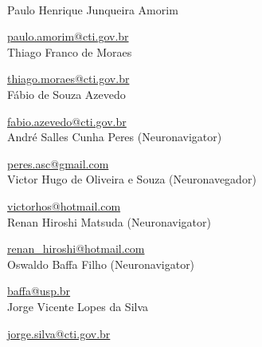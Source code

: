 \scalebox{2.0}{\sffamily Authors}
\\

Paulo Henrique Junqueira Amorim

\href{mailto:paulo.amorim@cti.gov.br}{paulo.amorim@cti.gov.br}
\\


Thiago Franco de Moraes


\href{mailto:thiago.moraes@cti.gov.br}{thiago.moraes@cti.gov.br}
\\

Fábio de Souza Azevedo


\href{mailto:fabio.azevedo@cti.gov.br}{fabio.azevedo@cti.gov.br}
\\


André Salles Cunha Peres (Neuronavigator)

\href{mailto:peres.asc@gmail.com}{peres.asc@gmail.com}
\\

Victor Hugo de Oliveira e Souza  (Neuronavegador)

\href{mailto:victorhos@hotmail.com}{victorhos@hotmail.com}
\\


Renan Hiroshi Matsuda (Neuronavigator)

\href{mailto:renan\_hiroshi@hotmail.com}{renan\_hiroshi@hotmail.com}
\\


Oswaldo Baffa Filho (Neuronavigator)

\href{mailto:baffa@usp.br}{baffa@usp.br}
\\

Jorge Vicente Lopes da Silva


\href{mailto:jorge.silva@cti.gov.br}{jorge.silva@cti.gov.br}
\\

